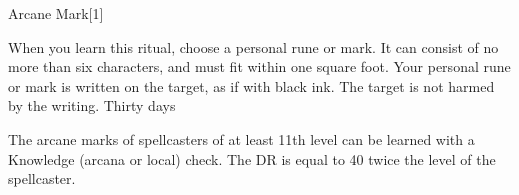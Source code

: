 \begin{spellsection}{Arcane Mark}[1]
    \begin{spellheader}
    \end{spellheader}
    \begin{spellcontent}
        \begin{spelltargetinginfo}
            \spellrng{\rngtouch}
        \end{spelltargetinginfo}
        \begin{spelleffects}
            \spellspecial When you learn this ritual, choose a personal rune or mark. It can consist of no more than six characters, and must fit within one square foot.
            \spelleffect Your personal rune or mark is written on the target, as if with black ink. The target is not harmed by the writing.
            \spelldur Thirty days
        \end{spelleffects}
    \end{spellcontent}
    \begin{spellfooter}
        \spellnotes The arcane marks of spellcasters of at least 11th level can be learned with a Knowledge (arcana or local) check. The DR is equal to 40 \sub twice the level of the spellcaster.
    \end{spellfooter}
    \begin{spellaugments}
    \end{spellaugments}
\end{spellsection}


